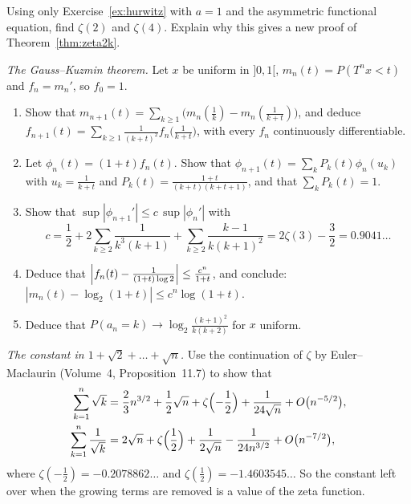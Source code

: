\begin{exercise}[$\star\star$]\label{ex:zeta2fe}
Using only Exercise~\ref{ex:hurwitz} with $a=1$ and the asymmetric functional equation, find $\zeta(2)$ and $\zeta(4)$. Explain why this gives a new proof
of Theorem~\ref{thm:zeta2k}.
\end{exercise}

\begin{exercise}[Journey]\label{pb:gausskuzmin}
\emph{The Gauss--Kuzmin theorem.} Let $x$ be uniform in $]0,1[$, $m_n(t)=P(T^nx<t)$ and $f_n=m_n'$, so $f_0=1$.
\begin{enumerate}[label=(\alph*)]
\item Show that $m_{n+1}(t)=\sum_{k\ge1}\bigl(m_n(\frac1k)-m_n(\frac1{k+t})\bigr)$, and deduce
$f_{n+1}(t)=\sum_{k\ge1}\frac1{(k+t)^2}f_n\bigl(\frac1{k+t}\bigr)$, with every $f_n$ continuously differentiable.
\item Let $\phi_n(t)=(1+t)f_n(t)$. Show that $\phi_{n+1}(t)=\sum_kP_k(t)\phi_n(u_k)$ with $u_k=\frac1{k+t}$ and
$P_k(t)=\frac{1+t}{(k+t)(k+t+1)}$, and that $\sum_kP_k(t)=1$.
\item Show that $\sup|\phi_{n+1}'|\le c\,\sup|\phi_n'|$ with
\[
c=\frac12+2\sum_{k\ge2}\frac1{k^3(k+1)}+\sum_{k\ge2}\frac{k-1}{k(k+1)^2}=2\zeta(3)-\frac32=0.9041\ldots
\]
\item Deduce that $\Bigl|f_n(t)-\frac1{(1+t)\log2}\Bigr|\le\frac{c^n}{1+t}$, and conclude: $|m_n(t)-\log_2(1+t)|\le c^n\log(1+t)$.
\item Deduce that $P(a_n=k)\to\log_2\frac{(k+1)^2}{k(k+2)}$ for $x$ uniform.
\end{enumerate}
\end{exercise}

\begin{exercise}[$\star\star$]\label{pb:sqrtsum}
\emph{The constant in $1+\sqrt2+\dots+\sqrt n$.} Use the continuation of $\zeta$ by Euler--Maclaurin (Volume~4, Proposition~11.7) to show that
\[
\begin{aligned}\sum_{k=1}^n\sqrt k&=\frac23n^{3/2}+\frac12\sqrt n+\zeta\Bigl(-\frac12\Bigr)+\frac1{24\sqrt n}+O\bigl(n^{-5/2}\bigr),\\
\sum_{k=1}^n\frac1{\sqrt k}&=2\sqrt n+\zeta\Bigl(\frac12\Bigr)+\frac1{2\sqrt n}-\frac1{24n^{3/2}}+O\bigl(n^{-7/2}\bigr),\end{aligned}
\]
where $\zeta(-\frac12)=-0.2078862\ldots$ and $\zeta(\frac12)=-1.4603545\ldots$ So the constant left over when the growing terms are removed is a value of the zeta function.
\end{exercise}

